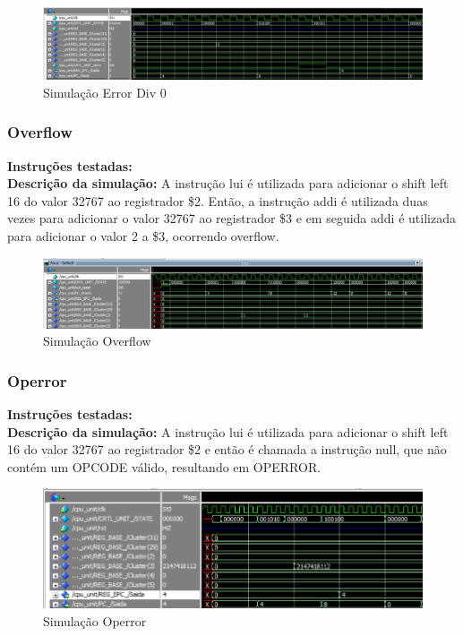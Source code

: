 \newpage

\begin{figure}[htbp!]
\centering
\includegraphics[width=1\textwidth]{figure/simulacao_div_por_zero.png}
\caption{Simulação Error Div 0} 
\label{fig:imagem_massa}
\end{figure}

\subsubsection{Overflow}
\textbf{Instruções testadas:} 
 \\

\textbf{Descrição da simulação:} A instrução lui é utilizada para adicionar o shift left 16 do valor 32767 ao registrador \$2. Então, a instrução addi é utilizada duas vezes para adicionar o valor 32767 ao registrador \$3 e em seguida addi é utilizada para adicionar o valor 2 a \$3, ocorrendo overflow.  \\

\begin{figure}[htbp!]
\centering
\includegraphics[width=1\textwidth]{figure/simulacao_break.png}
\caption{Simulação Overflow} 
\label{fig:imagem_massa}
\end{figure}

\subsubsection{Operror}
\textbf{Instruções testadas:}
 \\

\textbf{Descrição da simulação:} A instrução lui é utilizada para adicionar o shift left 16 do valor 32767 ao registrador \$2 e então é chamada a instrução null, que não contém um OPCODE válido, resultando em OPERROR.\\

\begin{figure}[htbp!]
\centering
\includegraphics[width=1\textwidth]{figure/simulacao_operror.png}
\caption{Simulação Operror} 
\label{fig:imagem_massa}
\end{figure}

